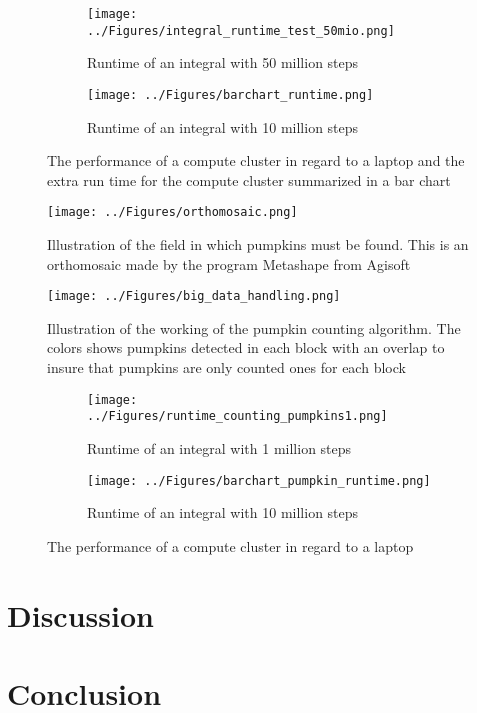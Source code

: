\documentclass[../Head/Report.tex]{subfiles}
\begin{document}
\begin{figure}[H]
\centering
\captionsetup{justification=centering}
  \begin{subfigure}[b]{0.48\textwidth}
  \centering
    \texttt{[image: ../Figures/integral\_runtime\_test\_50mio.png]}
    \caption{Runtime of an integral with 50 million steps}
    \label{fig:integral_runtime_50mio}
  \end{subfigure}
  \hfill
  \begin{subfigure}[b]{0.48\textwidth}
  \centering
    \texttt{[image: ../Figures/barchart\_runtime.png]}
    \caption{Runtime of an integral with 10 million steps}
    \label{fig:extra_runtime_cluster}
  \end{subfigure}
  \caption{The performance of a compute cluster in regard to a laptop and the extra run time for the compute cluster summarized in a bar chart}
\end{figure}

\begin{figure}[H]
	\centering
	\captionsetup{justification=centering}
	\texttt{[image: ../Figures/orthomosaic.png]}
    \caption{Illustration of the field in which pumpkins must be found. This is an orthomosaic made by the program Metashape from Agisoft}
    \label{fig:created_files}
\end{figure}

\begin{figure}[H]
	\centering
	\captionsetup{justification=centering}
	\texttt{[image: ../Figures/big\_data\_handling.png]}
    \caption{Illustration of the working of the pumpkin counting algorithm. The colors shows pumpkins detected in each block with an overlap to insure that pumpkins are only counted ones for each block}
    \label{fig:created_files}
\end{figure}

\begin{figure}[H]
\centering
  \begin{subfigure}[b]{0.48\textwidth}
  \centering
    \texttt{[image: ../Figures/runtime\_counting\_pumpkins1.png]}
    \caption{Runtime of an integral with 1 million steps}
    \label{fig:integral_runtime_1mio}
  \end{subfigure}
  \hfill
  \begin{subfigure}[b]{0.48\textwidth}
  \centering
    \texttt{[image: ../Figures/barchart\_pumpkin\_runtime.png]}
    \caption{Runtime of an integral with 10 million steps}
    \label{fig:integral_runtime_10mio}
  \end{subfigure}
  \caption{The performance of a compute cluster in regard to a laptop}
\end{figure}

\section{Discussion}
\section{Conclusion}
\end{document}
